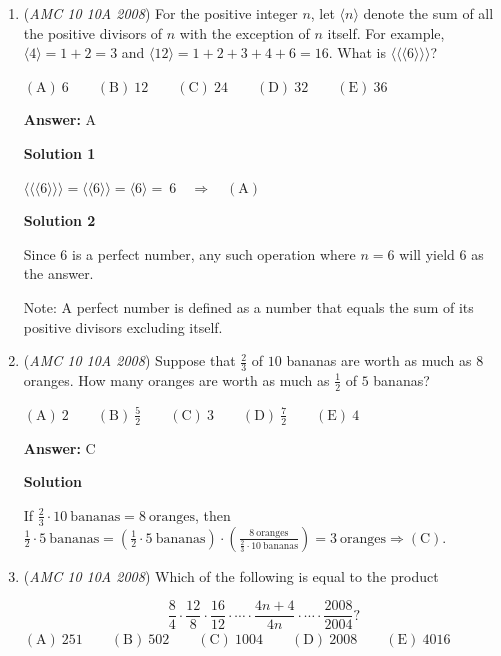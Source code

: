 \begin{enumerate}
	\item (\textit{AMC 10 10A 2008}) For the positive integer $n$, let $\langle n\rangle$ denote the sum of all the positive divisors of $n$ with the exception of $n$ itself. For example, $\langle 4\rangle=1+2=3$ and $\langle 12 \rangle =1+2+3+4+6=16$. What is $\langle\langle\langle 6\rangle\rangle\rangle$?


 $\mathrm{(A)}\ 6\qquad\mathrm{(B)}\ 12\qquad\mathrm{(C)}\ 24\qquad\mathrm{(D)}\ 32\qquad\mathrm{(E)}\ 36$

 \textbf{Answer: }A



\textbf{Solution 1}

$\langle\langle\langle 6\rangle\rangle\rangle= \langle\langle 6\rangle\rangle = \langle 6\rangle=\ 6\quad\Longrightarrow\quad\mathrm{(A)}$




\textbf{Solution 2}

Since $6$ is a perfect number, any such operation where $n=6$ will yield $6$ as the answer. 

 Note: A perfect number is defined as a number that equals the sum of its positive divisors excluding itself.

 


	\item (\textit{AMC 10 10A 2008}) Suppose that $\frac{2}{3}$ of $10$ bananas are worth as much as $8$ oranges. How many oranges are worth as much as $\frac{1}{2}$ of $5$ bananas?


 $\mathrm{(A)}\ 2\qquad\mathrm{(B)}\ \frac{5}{2}\qquad\mathrm{(C)}\ 3\qquad\mathrm{(D)}\ \frac{7}{2}\qquad\mathrm{(E)}\ 4$

 \textbf{Answer: }C



\textbf{Solution}

If $\frac{2}{3}\cdot10\ \text{bananas}=8\ \text{oranges}$, then $\frac{1}{2}\cdot5\ \text{bananas}=\left(\frac{1}{2}\cdot 5\ \text{bananas}\right)\cdot\left(\frac{8\ \text{oranges}}{\frac{2}{3}\cdot10\ \text{bananas}}\right)=3\ \text{oranges}\Longrightarrow\mathrm{(C)}$. 

 


	\item (\textit{AMC 10 10A 2008}) Which of the following is equal to the product

 \[\frac{8}{4}\cdot\frac{12}{8}\cdot\frac{16}{12}\cdot\cdots\cdot\frac{4n+4}{4n}\cdot\cdots\cdot\frac{2008}{2004}?\]
$\mathrm{(A)}\ 251\qquad\mathrm{(B)}\ 502\qquad\mathrm{(C)}\ 1004\qquad\mathrm{(D)}\ 2008\qquad\mathrm{(E)}\ 4016$


\end{enumerate}
